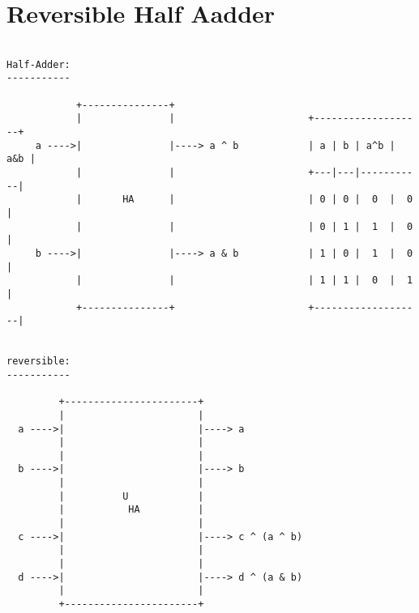 \documentclass{article}
\begin{document}
\section{Reversible Half Aadder}

\begin{verbatim}

Half-Adder:
-----------

            +---------------+
            |               |                       +-------------------+
     a ---->|               |----> a ^ b            | a | b | a^b | a&b |
            |               |                       +---|---|-----------|
            |       HA      |                       | 0 | 0 |  0  |  0  |
            |               |                       | 0 | 1 |  1  |  0  |
     b ---->|               |----> a & b            | 1 | 0 |  1  |  0  |
            |               |                       | 1 | 1 |  0  |  1  |
            +---------------+                       +-------------------|


reversible:
-----------

         +-----------------------+
         |                       |
  a ---->|                       |----> a    
         |                       |
         |                       |
  b ---->|                       |----> b    
         |                       |
         |          U            |
         |           HA          |
         |                       |
  c ---->|                       |----> c ^ (a ^ b)   
         |                       |
         |                       |
  d ---->|                       |----> d ^ (a & b)  
         |                       |
         +-----------------------+
\end{verbatim}
\end{document}
